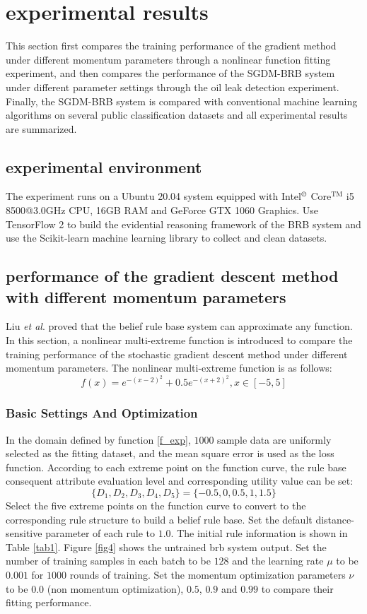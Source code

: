 \documentclass{ieeeaccess}
\begin{document}
\section{experimental results}
This section first compares the training performance of the gradient method under different momentum parameters through a nonlinear function fitting experiment,
and then compares the performance of the SGDM-BRB system under different parameter settings through the oil leak detection experiment.
Finally, the SGDM-BRB system is compared with conventional machine learning algorithms on several public classification datasets and all experimental results are summarized.

\subsection{experimental environment}
The experiment runs on a Ubuntu 20.04 system equipped with Intel$^{\copyright}$ Core$^{\text{TM}}$ i5 8500@3.0GHz CPU, 16GB RAM and GeForce GTX 1060 Graphics.
Use TensorFlow 2 to build the evidential reasoning framework of the BRB system and use the Scikit-learn machine learning library to collect and clean datasets.

\subsection{performance of the gradient descent method with different momentum parameters}
Liu \textit{et al}.\cite{a16} proved that the belief rule base system can approximate any function.
In this section, a nonlinear multi-extreme function is introduced to compare the training performance of the stochastic gradient descent method under different momentum parameters.
The nonlinear multi-extreme function is as follows:
\begin{equation}
    f(x)=e^{-(x-2)^2}+0.5e^{-(x+2)^2},x\in[-5,5]
    \label{f_exp}
\end{equation}

\subsubsection{Basic Settings And Optimization}
In the domain defined by function \eqref{f_exp}, $1000$ sample data are uniformly selected as the fitting dataset, and the mean square error is used as the loss function.
According to each extreme point on the function curve, the rule base consequent attribute evaluation level and corresponding utility value can be set:
$$\{D_1,D_2,D_3,D_4,D_5\}=\{-0.5,0,0.5,1,1.5\}$$
Select the five extreme points on the function curve to convert to the corresponding rule structure to build a belief rule base.
Set the default distance-sensitive parameter of each rule to $1.0$.
The initial rule information is shown in Table \ref{tab1}. Figure \ref{fig4} shows the untrained brb system output.
Set the number of training samples in each batch to be $128$ and the learning rate $\mu$ to be $0.001$ for $1000$ rounds of training.
Set the momentum optimization parameters $\nu$ to be 0.0 (non momentum optimization), $0.5$, $0.9$ and $0.99$ to compare their fitting performance.
\end{document}
